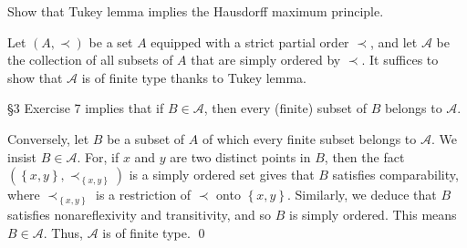 \documentclass[a4paper,12pt]{article}
\begin{document}
\begin{exe}
	Show that Tukey lemma implies the Hausdorff maximum principle.
\end{exe}
\begin{sol}
	Let \( (A,\prec) \) be a set \( A \) equipped with a strict partial order \( \prec \),
	and let \( \mathcal{A} \) be the collection of all subsets of \( A \)
	that are simply ordered by \( \prec \).
	It suffices to show that \( \mathcal{A} \) is of finite type  thanks to Tukey lemma.
	
	\S3 Exercise 7 implies that if \( B\in \mathcal{A} \), then every (finite) subset of \( B \) belongs to \( \mathcal{A}\).
	
	Conversely, let \( B \) be a subset of \( A \) of which every finite subset belongs to \( \mathcal{A} \).
	We insist \( B \in \mathcal{A} \).
	For, if \( x \) and \( y \) are two distinct points in \( B \),
	then the fact \( \left( \left\{ x,y \right\},\prec_{\left\{ x,y \right\}} \right)\)
	is a simply ordered set gives that
	\( B \) satisfies comparability,
	where \( \prec_{\left\{ x,y \right\}} \) is a restriction of \( \prec \) onto
	\( \left\{ x,y \right\}\).
	Similarly, we deduce that \( B \) satisfies nonareflexivity and transitivity,
	and so \( B \) is simply ordered.
	This means \( B \in \mathcal{A} \).
	Thus, \( \mathcal{A} \) is of finite type.
	\qed\end{sol}
\end{document}

